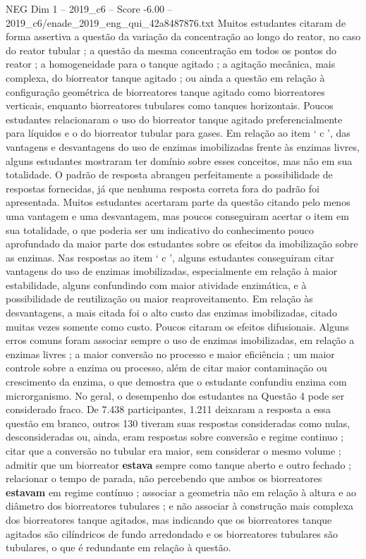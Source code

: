 \begin{textsample}{NEG Dim 1 – 2019\_c6 – Score -6.00 – 2019\_c6/enade\_2019\_eng\_qui\_42a8487876.txt}
Muitos estudantes citaram de forma assertiva a questão da variação da concentração ao longo do reator, no caso do reator tubular ; a questão da mesma concentração em todos os pontos do reator ; a homogeneidade para o tanque agitado ; a agitação mecânica, mais complexa, do biorreator tanque agitado ; ou ainda a questão em relação à configuração geométrica de biorreatores tanque agitado como biorreatores verticais, enquanto biorreatores tubulares como tanques horizontais.
Poucos estudantes relacionaram o uso do biorreator tanque agitado preferencialmente para líquidos e o do biorreator tubular para gases.
Em relação ao item ‘ c ’, das vantagens e desvantagens do uso de enzimas imobilizadas frente às enzimas livres, alguns estudantes mostraram ter domínio sobre esses conceitos, mas não em sua totalidade.
O padrão de resposta abrangeu perfeitamente a possibilidade de respostas fornecidas, já que nenhuma resposta correta fora do padrão foi apresentada.
Muitos estudantes acertaram parte da questão citando pelo menos uma vantagem e uma desvantagem, mas poucos conseguiram acertar o item em sua totalidade, o que poderia ser um indicativo do conhecimento pouco aprofundado da maior parte dos estudantes sobre os efeitos da imobilização sobre as enzimas.
Nas respostas ao item ‘ c ’, alguns estudantes conseguiram citar vantagens do uso de enzimas imobilizadas, especialmente em relação à maior estabilidade, alguns confundindo com maior atividade enzimática, e à possibilidade de reutilização ou maior reaproveitamento.
Em relação às desvantagens, a mais citada foi o alto custo das enzimas imobilizadas, citado muitas vezes somente como custo.
Poucos citaram os efeitos difusionais.
Alguns erros comuns foram associar sempre o uso de enzimas imobilizadas, em relação a enzimas livres ; a maior conversão no processo e maior eficiência ; um maior controle sobre a enzima ou processo, além de citar maior contaminação ou crescimento da enzima, o que demostra que o estudante confundiu enzima com microrganismo.
No geral, o desempenho dos estudantes na Questão 4 pode ser considerado fraco.
De 7.438 participantes, 1.211 deixaram a resposta a essa questão em branco, outros 130 tiveram suas respostas consideradas como nulas, desconsideradas ou, ainda, eram respostas sobre conversão e regime continuo ; citar que a conversão no tubular era maior, sem considerar o mesmo volume ; admitir que um biorreator \textbf{estava} sempre como tanque aberto e outro fechado ; relacionar o tempo de parada, não percebendo que ambos os biorreatores \textbf{estavam} em regime contínuo ; associar a geometria não em relação à altura e ao diâmetro dos biorreatores tubulares ; e não associar à construção mais complexa dos biorreatores tanque agitados, mas indicando que os biorreatores tanque agitados são cilíndricos de fundo arredondado e os biorreatores tubulares são tubulares, o que é redundante em relação à questão.

\end{textsample}
